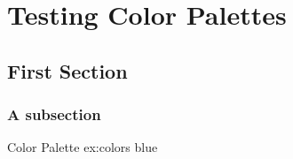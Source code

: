 \chapter{Testing Color Palettes}

\section{First Section}

\lipsum[1]
\subsection{A subsection}
\lipsum[1]
\begin{texexample}{Color Palette} {ex:colors}
\def\atest{blue}
\atest
\end{texexample}
